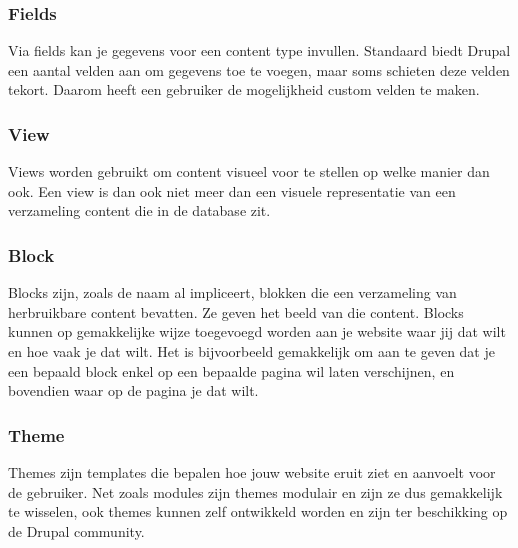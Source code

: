 \subsubsection{Fields}
Via fields kan je gegevens voor een content type invullen. Standaard biedt Drupal een aantal velden aan om gegevens toe te voegen, maar soms schieten deze velden tekort. Daarom heeft een gebruiker de mogelijkheid custom velden te maken.

\subsubsection{View}
Views worden gebruikt om content visueel voor te stellen op welke manier dan ook. Een view is dan ook niet meer dan een visuele representatie van een verzameling content die in de database zit.

\subsubsection{Block}
Blocks zijn, zoals de naam al impliceert, blokken die een verzameling van herbruikbare content bevatten. Ze geven het beeld van die content. Blocks kunnen op gemakkelijke wijze toegevoegd worden aan je website waar jij dat wilt en hoe vaak je dat wilt. Het is bijvoorbeeld gemakkelijk om aan te geven dat je een bepaald block enkel op een bepaalde pagina wil laten verschijnen, en bovendien waar op de pagina je dat wilt.

\subsubsection{Theme}
Themes zijn templates die bepalen hoe jouw website eruit ziet en aanvoelt voor de gebruiker. Net zoals modules zijn themes modulair en zijn ze dus gemakkelijk te wisselen, ook themes kunnen zelf ontwikkeld worden en zijn ter beschikking op de Drupal community.

